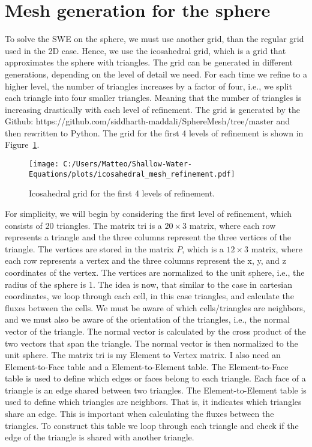 \section{Mesh generation for the sphere}
To solve the SWE on the sphere, we must use another grid, than the regular grid used in the 2D case.
Hence, we use the icosahedral grid, which is a grid that approximates the sphere with triangles.
The grid can be generated in different generations, depending on the level of detail we need. 
For each time we refine to a higher level, the number of triangles increases by a factor of four, i.e., we split each triangle into four smaller triangles.
Meaning that the number of triangles is increasing drastically with each level of refinement.
The grid is generated by the Github: https://github.com/siddharth-maddali/SphereMesh/tree/master and then rewritten to Python.
The grid for the first 4 levels of refinement is shown in Figure~\ref{fig:icosahedral_grid}.
\begin{figure}
    \centering
    \texttt{[image: C:/Users/Matteo/Shallow-Water-Equations/plots/icosahedral\_mesh\_refinement.pdf]}
    \caption{Icosahedral grid for the first 4 levels of refinement.}\label{fig:icosahedral_grid}
\end{figure}
For simplicity, we will begin by considering the first level of refinement, which consists of 20 triangles.
The matrix tri is a $20 \times 3$ matrix, where each row represents a triangle and the three columns represent the three vertices of the triangle.
The vertices are stored in the matrix $P$, which is a $12 \times 3$ matrix, where each row represents a vertex and the three columns represent the x, y, and z coordinates of the vertex.
The vertices are normalized to the unit sphere, i.e., the radius of the sphere is 1.
The idea is now, that similar to the case in cartesian coordinates, we loop through each cell, in this case triangles, and calculate the fluxes between the cells.
We must be aware of which cells/triangles are neighbors, and we must also be aware of the orientation of the triangles, i.e., the normal vector of the triangle.
The normal vector is calculated by the cross product of the two vectors that span the triangle.
The normal vector is then normalized to the unit sphere.
The matrix tri is my Element to Vertex matrix. 
I also need an Element-to-Face table and a Element-to-Element table.
The Element-to-Face table is used to define which edges or faces belong to each triangle.
Each face of a triangle is an edge shared between two triangles.
The Element-to-Element table is used to define which triangles are neighbors. 
That is, it indicates which triangles share an edge. This is important when calculating the fluxes between the triangles.
To construct this table we loop through each triangle and check if the edge of the triangle is shared with another triangle.


